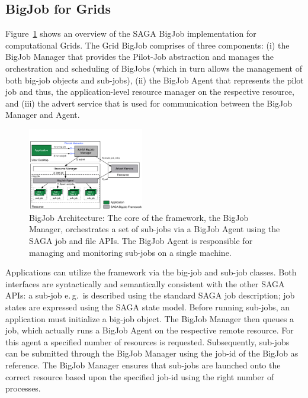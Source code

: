 \documentclass[conference,final]{IEEEtran}
\newcommand{\up}{\vspace*{-1em}}
\newcommand{\alnote}[1]{ {\textcolor{blue} { ***AL: #1 }}}
\newcommand{\jhanote}[1]{ {\textcolor{red} { ***SJ: #1 }}}
\newcommand{\alnote}[1]{}
\newcommand{\jhanote}[1]{}
\begin{document}

\up
\subsection{BigJob for Grids}
\up

Figure~\ref{fig:figures_bigjob} shows an overview of the SAGA BigJob 
implementation for computational Grids. The Grid BigJob comprises 
of three components: (i) the BigJob Manager that
provides the Pilot-Job abstraction and manages the orchestration and
scheduling of BigJobs (which in turn allows the management of both
big-job objects and sub-jobs), (ii) the BigJob Agent that represents the
pilot job and thus, the application-level resource manager on the
respective resource, and (iii) the advert service that is used for
communication between the BigJob Manager and Agent.

\begin{figure}[ht]
    \centering
    \includegraphics[width=0.45\textwidth]{figures/bigjob}
   \caption{BigJob Architecture: The core of the framework, the
      BigJob Manager, orchestrates a set of sub-jobs via a
      BigJob Agent using the SAGA job and file APIs.  The
      BigJob Agent is responsible for managing and monitoring sub-jobs
      on a single machine.}
   \label{fig:figures_bigjob}
\end{figure}

Applications can utilize the framework via the big-job and sub-job
classes. Both interfaces are syntactically and semantically consistent
with the other SAGA APIs: a sub-job e.\,g.\ is described using 
the standard SAGA job description; job states are expressed
using the SAGA state model. Before running sub-jobs, an application must initialize
a big-job object. The BigJob Manager then queues a job,
which actually runs a BigJob Agent on the respective remote
resource. For this agent a specified number of resources is
requested. Subsequently, sub-jobs can be submitted through the BigJob
Manager using the job-id of the BigJob as reference. The BigJob
Manager ensures that sub-jobs are launched onto the correct
resource based upon the specified job-id using the right number of
processes. 
\end{document}
